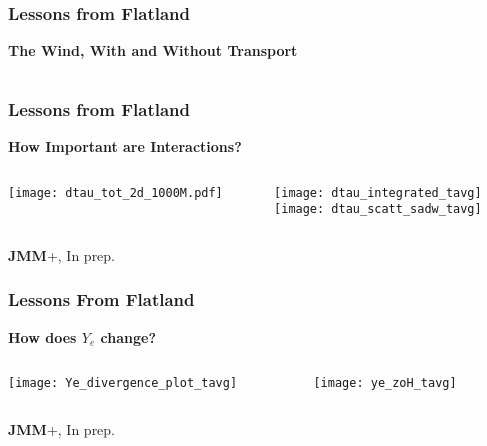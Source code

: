 \documentclass[]{beamer}
\begin{document}
\begin{frame}
  \frametitle{Lessons from Flatland}
  \textbf{The Wind, With and Without Transport}
  \begin{columns}
    \begin{column}{6cm}
      \begin{center}
      \end{center}
    \end{column}
    \begin{column}{6cm}
      \begin{center}
      \end{center}
    \end{column}
  \end{columns}
\end{frame}

\begin{frame}
  \frametitle{Lessons from Flatland}
  \textbf{How Important are Interactions?}
  \begin{columns}
    \begin{column}{5cm}
      \begin{center}
        \texttt{[image: dtau\_tot\_2d\_1000M.pdf]}
      \end{center}
    \end{column}
    \begin{column}{7cm}
        \texttt{[image: dtau\_integrated\_tavg]}\\
        \texttt{[image: dtau\_scatt\_sadw\_tavg]}
    \end{column}
  \end{columns}
  \textbf{JMM}+, In prep.
\end{frame}

\begin{frame}
  \frametitle{Lessons From Flatland}
  \textbf{How does $Y_e$ change?}
  \begin{columns}
    \begin{column}{5cm}
      \begin{center}
        \texttt{[image: Ye\_divergence\_plot\_tavg]}
      \end{center}
    \end{column}
    \begin{column}{7cm}
      \begin{center}
        \texttt{[image: ye\_zoH\_tavg]}
      \end{center}
    \end{column}
  \end{columns}
  \textbf{JMM}+, In prep.
\end{frame}
\end{document}
